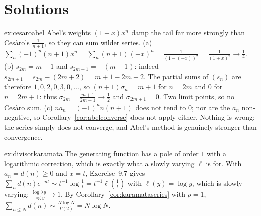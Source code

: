 \section{Solutions}

\begin{solution}{ex:cesaroabel}
\idea Abel's weights $(1-x)x^n$ damp the tail far more strongly than Ces\`aro's $\frac1{n+1}$, so they can sum wilder series.
\writeup (a) $\sum_n(-1)^n(n+1)x^n=\sum_n(n+1)(-x)^n=\frac1{(1-(-x))^2}=\frac1{(1+x)^2}\to\frac14$. (b) $s_{2m}=m+1$ and $s_{2m+1}=-(m+1)$: indeed
$s_{2m+1}=s_{2m}-(2m+2)=m+1-2m-2$. The partial sums of $(s_n)$ are therefore $1,0,2,0,3,0,\dots$, so $(n+1)\sigma_n=m+1$ for $n=2m$ and $0$ for $n=2m+1$: thus
$\sigma_{2m}=\frac{m+1}{2m+1}\to\frac12$ and $\sigma_{2m+1}=0$. Two limit points, so no Ces\`aro sum. (c) $na_n=(-1)^nn(n+1)$ does not tend to $0$; nor are the $a_n$
non-negative, so Corollary~\ref{cor:abelconverse} does not apply either. Nothing is wrong: the series simply does not converge, and Abel's method is
genuinely stronger than convergence.
\end{solution}

\begin{solution}{ex:divisorkaramata}
\idea The generating function has a pole of order $1$ with a logarithmic correction, which is exactly what a slowly varying $\ell$ is for.
\writeup With $a_n=d(n)\ge0$ and $x=t$, Exercise~9.7 gives $\sum_nd(n)e^{-nt}\sim t^{-1}\log\frac1t=t^{-1}\ell(\frac1t)$ with $\ell(y)=\log y$, which is slowly
varying: $\frac{\log\lambda y}{\log y}\to1$. By Corollary~\ref{cor:karamataseries} with $\rho=1$, $\sum_{n\le N}d(n)\sim\frac{N\log N}{\Gamma(2)}=N\log N$.
\end{solution}

